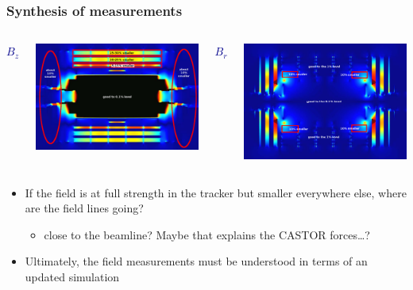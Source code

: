 \documentclass[compress]{beamer}
\begin{document}
\begin{frame}
\frametitle{Synthesis of measurements}

\begin{columns}
\begin{center}
\textcolor{darkblue}{\Large $B_z$}
\end{center}

\includegraphics[width=\linewidth]{iguana_Bz.png}

\begin{center}
\textcolor{darkblue}{\Large $B_r$}
\end{center}

\includegraphics[width=\linewidth]{iguana_Br.png}
\end{columns}

\vfill
\begin{itemize}
\item If the field is at full strength in the tracker but smaller everywhere else, where are the field lines going?
\begin{itemize}
\item close to the beamline?  Maybe that explains the CASTOR \mbox{forces\ldots?\hspace{-1 cm}}
\end{itemize}

\item Ultimately, the field measurements must be understood in terms of an updated simulation
\end{itemize}
\end{frame}
\end{document}
